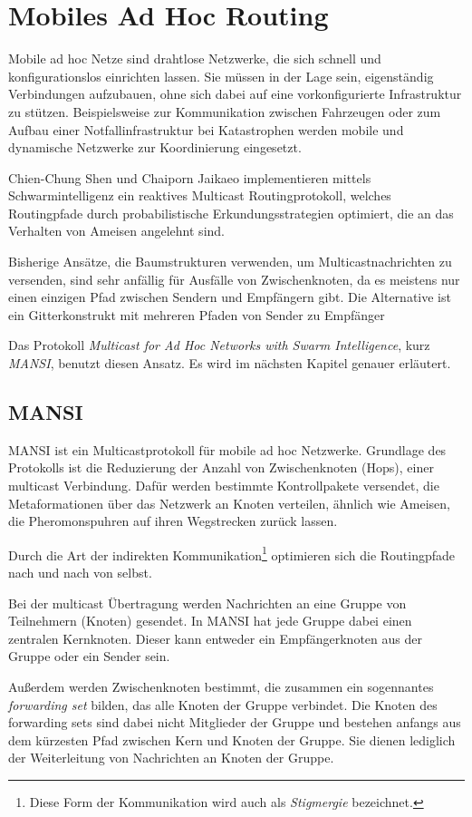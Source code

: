 \chapter{Mobiles Ad Hoc Routing}
Mobile ad hoc Netze sind drahtlose Netzwerke, die sich schnell und konfigurationslos einrichten lassen.
Sie müssen in der Lage sein, eigenständig Verbindungen aufzubauen, ohne sich dabei auf eine vorkonfigurierte
Infrastruktur zu stützen.
Beispielsweise zur Kommunikation zwischen Fahrzeugen oder zum Aufbau einer Notfallinfrastruktur bei Katastrophen
werden mobile und dynamische Netzwerke zur Koordinierung eingesetzt.

Chien-Chung Shen und Chaiporn Jaikaeo 
implementieren mittels Schwarmintelligenz ein reaktives Multicast Routingprotokoll,
welches Routingpfade durch probabilistische Erkundungsstrategien optimiert, die an das Verhalten von Ameisen angelehnt sind.

Bisherige Ansätze, die Baumstrukturen verwenden, um Multicastnachrichten zu versenden,
sind sehr anfällig für Ausfälle von Zwischenknoten, da es meistens nur einen einzigen Pfad zwischen Sendern und Empfängern gibt.
Die Alternative ist ein Gitterkonstrukt mit mehreren Pfaden von Sender zu Empfänger

Das Protokoll \emph{Multicast for Ad Hoc Networks with Swarm Intelligence}, kurz \emph{MANSI}, benutzt diesen Ansatz.
Es wird im nächsten Kapitel genauer erläutert.

\section{MANSI}
MANSI ist ein Multicastprotokoll für mobile ad hoc Netzwerke.
Grundlage des Protokolls ist die Reduzierung der Anzahl von Zwischenknoten (Hops), einer multicast Verbindung.
Dafür werden bestimmte Kontrollpakete  versendet, die Metaformationen über das Netzwerk an Knoten verteilen, ähnlich wie Ameisen, die Pheromonspuhren auf ihren Wegstrecken zurück lassen.

Durch die Art der indirekten Kommunikation\footnote{Diese Form der Kommunikation wird auch als
\emph{Stigmergie} bezeichnet.} optimieren sich die Routingpfade nach und nach von selbst.

Bei der multicast Übertragung werden Nachrichten an eine Gruppe von Teilnehmern (Knoten) gesendet.
In MANSI hat jede Gruppe dabei einen zentralen Kernknoten.
Dieser kann entweder ein Empfängerknoten aus der Gruppe oder ein Sender sein.

Außerdem werden Zwischenknoten bestimmt, die zusammen ein sogennantes \emph{forwarding set} bilden,
das alle Knoten der Gruppe verbindet.
Die Knoten des forwarding sets sind dabei nicht Mitglieder der Gruppe und bestehen 
anfangs aus dem kürzesten Pfad zwischen Kern und Knoten der Gruppe.
Sie dienen lediglich der Weiterleitung von Nachrichten an Knoten der Gruppe.

